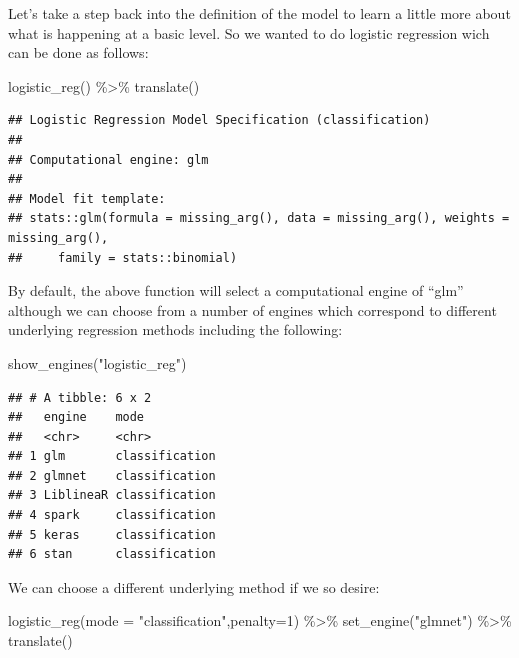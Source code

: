 \documentclass[
]{article}
\newenvironment{Shaded}{\begin{snugshade}}{\end{snugshade}}
\newcommand{\AttributeTok}[1]{\textcolor[rgb]{0.77,0.63,0.00}{#1}}
\newcommand{\DecValTok}[1]{\textcolor[rgb]{0.00,0.00,0.81}{#1}}
\newcommand{\FunctionTok}[1]{\textcolor[rgb]{0.00,0.00,0.00}{#1}}
\newcommand{\NormalTok}[1]{#1}
\newcommand{\SpecialCharTok}[1]{\textcolor[rgb]{0.00,0.00,0.00}{#1}}
\newcommand{\StringTok}[1]{\textcolor[rgb]{0.31,0.60,0.02}{#1}}
\begin{document}
Let's take a step back into the definition of the model to learn a
little more about what is happening at a basic level. So we wanted to do
logistic regression wich can be done as follows:

\begin{Shaded}
\begin{Highlighting}[]
\FunctionTok{logistic\_reg}\NormalTok{() }\SpecialCharTok{\%\textgreater{}\%} \FunctionTok{translate}\NormalTok{()}
\end{Highlighting}
\end{Shaded}

\begin{verbatim}
## Logistic Regression Model Specification (classification)
## 
## Computational engine: glm 
## 
## Model fit template:
## stats::glm(formula = missing_arg(), data = missing_arg(), weights = missing_arg(), 
##     family = stats::binomial)
\end{verbatim}

By default, the above function will select a computational engine of
``glm'' although we can choose from a number of engines which correspond
to different underlying regression methods including the following:

\begin{Shaded}
\begin{Highlighting}[]
 \FunctionTok{show\_engines}\NormalTok{(}\StringTok{"logistic\_reg"}\NormalTok{)}
\end{Highlighting}
\end{Shaded}

\begin{verbatim}
## # A tibble: 6 x 2
##   engine    mode          
##   <chr>     <chr>         
## 1 glm       classification
## 2 glmnet    classification
## 3 LiblineaR classification
## 4 spark     classification
## 5 keras     classification
## 6 stan      classification
\end{verbatim}

We can choose a different underlying method if we so desire:

\begin{Shaded}
\begin{Highlighting}[]
\FunctionTok{logistic\_reg}\NormalTok{(}\AttributeTok{mode =} \StringTok{"classification"}\NormalTok{,}\AttributeTok{penalty=}\DecValTok{1}\NormalTok{) }\SpecialCharTok{\%\textgreater{}\%} 
  \FunctionTok{set\_engine}\NormalTok{(}\StringTok{"glmnet"}\NormalTok{) }\SpecialCharTok{\%\textgreater{}\%} 
  \FunctionTok{translate}\NormalTok{()}
\end{Highlighting}
\end{Shaded}
\end{document}
